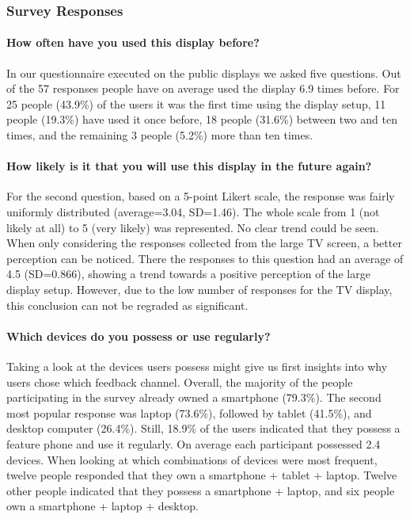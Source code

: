 	






	\subsubsection{Survey Responses}
	\label{5:results:survey}




	\paragraph{How often have you used this display before?}
	In our questionnaire executed on the public displays we asked five questions. Out of the 57 responses people have on average used the display 6.9 times before. For 25 people (43.9\%) of the users it was the first time using the display setup, 11 people (19.3\%) have used it once before, 18 people (31.6\%) between two and ten times, and the remaining 3 people (5.2\%) more than ten times.

	\paragraph{How likely is it that you will use this display in the future again?}
	For the second question, based on a 5-point Likert scale, the response was fairly uniformly distributed (average=3.04, SD=1.46). The whole scale from 1 (not likely at all) to 5 (very likely) was represented. No clear trend could be seen. When only considering the responses collected from the large TV screen, a better perception can be noticed. There the responses to this question had an average of 4.5 (SD=0.866), showing a trend towards a positive perception of the large display setup. However, due to the low number of responses for the TV display, this conclusion can not be regraded as significant. 

	\paragraph{Which devices do you possess or use regularly?}
	Taking a look at the devices users possess might give us first insights into why users chose which feedback channel. Overall, the majority of the people participating in the survey already owned a smartphone (79.3\%). The second most popular response was laptop (73.6\%), followed by tablet (41.5\%), and desktop computer (26.4\%). Still, 18.9\% of the users indicated that they possess a feature phone and use it regularly. On average each participant possessed 2.4 devices. 
	When looking at which combinations of devices were most frequent, twelve people responded that they own a smartphone + tablet + laptop. Twelve other people indicated that they possess a smartphone + laptop, and six people own a smartphone + laptop + desktop.

